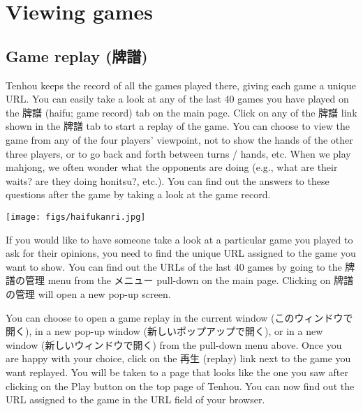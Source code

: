 \newpage
\section{Viewing games}
\subsection{Game replay (牌譜)}
{\jap Tenhou} keeps the record of all the games played there, giving each game a unique URL. 
You can easily take a look at any of the last 40 games you have played on the 牌譜 ({\jap haifu}; game record) tab on the main page. Click on any of the 牌譜 link shown in the 牌譜 tab to start a replay of the game. You can choose to view the game from any of the four players' viewpoint, not to show the hands of the other three players, or to go back and forth between turns / hands, etc. When we play mahjong, we often wonder what the opponents are doing (e.g., what are their waits? are they doing {\jap honitsu}?, etc.). You can find out the answers to these questions after the game by taking a look at the game record. 


\begin{center}
\vspace{1mm}
\texttt{[image: figs/haifukanri.jpg]}
\end{center}

If you would like to have someone take a look at a particular game you played to ask for their opinions, you need to find the unique URL assigned to the game you want to show. You can find out the URLs of the last 40 games by going to the 牌譜の管理 menu from the メニュー pull-down on the main page. 
Clicking on 牌譜の管理 will open a new pop-up screen.

\bigskip
You can choose to open a game replay in the current window (このウィンドウで開く), in a new pop-up window (新しいポップアップで開く), or in a new window (新しいウィンドウで開く) from the pull-down menu above. Once you are happy with your choice, click on the 再生 (replay) link next to the game you want replayed. 
You will be taken to a page that looks like the one you saw after clicking on the Play button on the top page of {\jap Tenhou}. You can now find out the URL assigned to the game in the URL field of your browser. 


